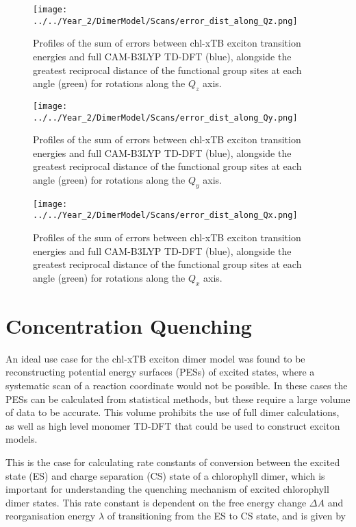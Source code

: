 \begin{figure}
    \centering
    \texttt{[image: ../../Year\_2/DimerModel/Scans/error\_dist\_along\_Qz.png]}
    \label{fig:error_along_qz}
    \caption{Profiles of the sum of errors between chl-xTB exciton transition energies
    and full CAM-B3LYP TD-DFT (blue), alongside the greatest reciprocal distance
    of the functional group sites at each angle (green) for rotations along the
    $Q_z$ axis.}
\end{figure}

\begin{figure}
    \centering
    \texttt{[image: ../../Year\_2/DimerModel/Scans/error\_dist\_along\_Qy.png]}
    \label{fig:error_along_qy}
    \caption{Profiles of the sum of errors between chl-xTB exciton transition energies
    and full CAM-B3LYP TD-DFT (blue), alongside the greatest reciprocal distance
    of the functional group sites at each angle (green) for rotations along the
    $Q_y$ axis.}
\end{figure}

\begin{figure}
    \centering
    \texttt{[image: ../../Year\_2/DimerModel/Scans/error\_dist\_along\_Qx.png]}
    \label{fig:error_along_qx}
    \caption{Profiles of the sum of errors between chl-xTB exciton transition energies
    and full CAM-B3LYP TD-DFT (blue), alongside the greatest reciprocal distance
    of the functional group sites at each angle (green) for rotations along the
    $Q_x$ axis.}
\end{figure}

\afterpartskip
\section{Concentration Quenching}
\label{sec:concentration_quenching}

An ideal use case for the chl-xTB exciton dimer model was found to be reconstructing
potential energy surfaces (PESs) of excited states, where a systematic scan of a
reaction coordinate would not be possible. In these cases the PESs can be calculated
from statistical methods, but these require a large volume of data to be accurate.
This volume prohibits the use of full dimer calculations, as well as high level
monomer TD-DFT that could be used to construct exciton models.

This is the case for calculating rate constants of conversion between the excited 
state (ES) and charge separation (CS) state of a chlorophyll dimer, which is important
for understanding the quenching mechanism of excited chlorophyll dimer states. This
rate constant is dependent on the free energy change $\Delta A$ and reorganisation
energy $\lambda$ of transitioning from the ES to CS state, and is given by

